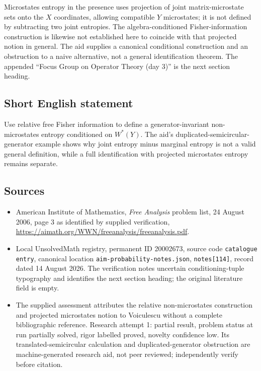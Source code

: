 \documentclass[11pt]{article}
\begin{document}
Microstates entropy in the presence uses projection of joint matrix-microstate sets onto the $X$ coordinates, allowing compatible $Y$ microstates; it is not defined by subtracting two joint entropies. The algebra-conditioned Fisher-information construction is likewise not established here to coincide with that projected notion in general. The aid supplies a canonical conditional construction and an obstruction to a naive alternative, not a general identification theorem. The appended ``Focus Group on Operator Theory (day 3)'' is the next section heading.
\subsection{Short English statement}
Use relative free Fisher information to define a generator-invariant non-microstates entropy conditioned on $W^*(Y)$. The aid's duplicated-semicircular-generator example shows why joint entropy minus marginal entropy is not a valid general definition, while a full identification with projected microstates entropy remains separate.
\subsection{Sources}
\begin{itemize}
\item American Institute of Mathematics, \emph{Free Analysis} problem list, 24 August 2006, page 3 as identified by supplied verification, \url{https://aimath.org/WWN/freeanalysis/freeanalysis.pdf}.
\item Local UnsolvedMath registry, permanent ID 20002673, source code \texttt{catalogue entry}, canonical location \texttt{aim-probability-notes.json}, \texttt{notes[114]}, record dated 14 August 2026. The verification notes uncertain conditioning-tuple typography and identifies the next section heading; the original literature field is empty.
\item The supplied assessment attributes the relative non-microstates construction and projected microstates notion to Voiculescu without a complete bibliographic reference. Research attempt 1: partial result, problem status at run partially solved, rigor labelled proved, novelty confidence low. Its translated-semicircular calculation and duplicated-generator obstruction are machine-generated research aid, not peer reviewed; independently verify before citation.
\end{itemize}
\end{document}
